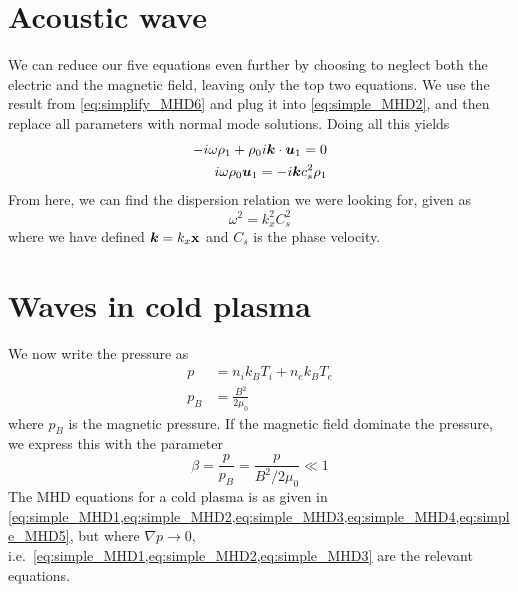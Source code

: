 \section{Acoustic wave}
We can reduce our five equations even further by choosing to neglect both the electric and the magnetic field, leaving only the top two equations. We use the result from \cref{eq:simplify_MHD6} and plug it into \cref{eq:simple_MHD2}, and then replace all parameters with normal mode solutions. Doing all this yields
\begin{align*}
    -i\omega\rho_1+\rho_0i\boldsymbol{k}\cdot\boldsymbol{u}_1=0\\
    i\omega\rho_0\boldsymbol{u}_1=-i\boldsymbol{k}c_s^2\rho_1
\end{align*}
From here, we can find the dispersion relation we were looking for, given as
\begin{equation*}
    \omega^2=k_x^2C_s^2
\end{equation*}
where we have defined \(\boldsymbol{k}=k_x\mathbf{x}\) and \(C_s\) is the phase velocity.

\section{Waves in cold plasma}
We now write the pressure as
\begin{align*}
    p&=n_{i}k_{B}T_i+n_{e}k_{B}T_e\\
    p_B&=\frac{B^2}{2\mu_0}
\end{align*}
where \(p_B\) is the magnetic pressure. If the magnetic field dominate the pressure, we express this with the parameter
\begin{equation*}
    \beta=\frac{p}{p_B}=\frac{p}{B^2/2\mu_0}\ll 1
\end{equation*}
The MHD equations for a cold plasma is as given in \cref{eq:simple_MHD1,eq:simple_MHD2,eq:simple_MHD3,eq:simple_MHD4,eq:simple_MHD5}, but where \(\nabla p\rightarrow 0\), i.e.\ \cref{eq:simple_MHD1,eq:simple_MHD2,eq:simple_MHD3} are the relevant equations.

